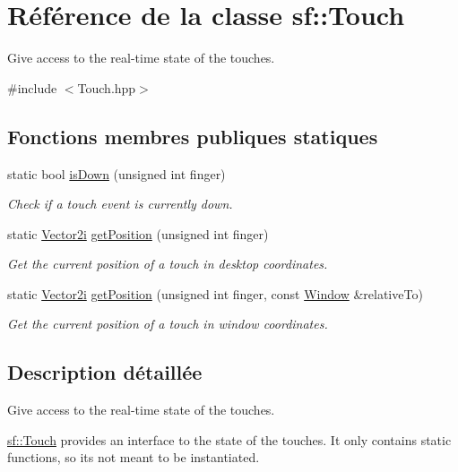 \hypertarget{classsf_1_1Touch}{}\section{Référence de la classe sf\+:\+:Touch}
\label{classsf_1_1Touch}


Give access to the real-\/time state of the touches.  




{\ttfamily \#include $<$Touch.\+hpp$>$}

\subsection*{Fonctions membres publiques statiques}
\begin{DoxyCompactItemize}
\item 
static bool \hyperlink{classsf_1_1Touch_a2f85297123ea4e401d02c346e50d48a3}{is\+Down} (unsigned int finger)
\begin{DoxyCompactList}\small\item\em Check if a touch event is currently down. \end{DoxyCompactList}\item 
static \hyperlink{classsf_1_1Vector2}{Vector2i} \hyperlink{classsf_1_1Touch_af1b7035be709091c7475075e43e2bc23}{get\+Position} (unsigned int finger)
\begin{DoxyCompactList}\small\item\em Get the current position of a touch in desktop coordinates. \end{DoxyCompactList}\item 
static \hyperlink{classsf_1_1Vector2}{Vector2i} \hyperlink{classsf_1_1Touch_a372acaba3c7ac70fca4614c16ac4a1bb}{get\+Position} (unsigned int finger, const \hyperlink{classsf_1_1Window}{Window} \&relative\+To)
\begin{DoxyCompactList}\small\item\em Get the current position of a touch in window coordinates. \end{DoxyCompactList}\end{DoxyCompactItemize}


\subsection{Description détaillée}
Give access to the real-\/time state of the touches. 

\hyperlink{classsf_1_1Touch}{sf\+::\+Touch} provides an interface to the state of the touches. It only contains static functions, so it\textquotesingle{}s not meant to be instantiated.

